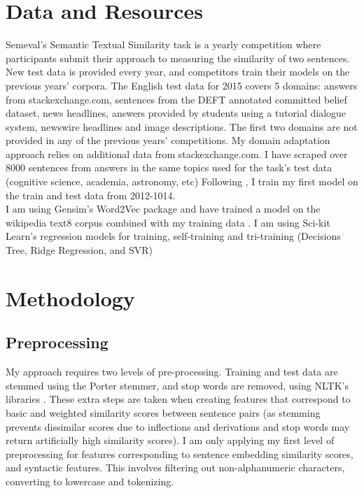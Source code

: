 \documentclass[11pt]{article}
\begin{document}
\section{Data and Resources}
Semeval's Semantic Textual Similarity task is a yearly competition where participants submit their approach to measuring the similarity of two sentences. New test data is provided every year, and competitors train their models on the previous years' corpora. The English test data for 2015 covers 5 domains: answers from stackexchange.com, sentences from the DEFT annotated committed belief dataset, news headlines, answers provided by students using a tutorial dialogue system, newswire headlines and image descriptions\cite{agirrea2015semeval}. The first two domains are not provided in any of the previous years' competitions. My domain adaptation approach relies on additional data from stackexchange.com. I have scraped over 8000 sentences from answers in the same topics used for the task's test data (cognitive science, academia, astronomy, etc) Following \cite{arora2015dcu}, I train my first model on the train and test data from 2012-1014.  \\

I am using Gensim's Word2Vec package and have trained a model on the wikipedia text8 corpus combined with my training data \cite{rehurek_lrec}. I am using Sci-kit Learn's regression models for training, self-training and tri-training (Decisions Tree, Ridge Regression, and SVR) \cite{scikit-learn}\\

\section{Methodology}
\subsection{Preprocessing}
My approach requires two levels of pre-processing. Training and test data are stemmed using the Porter stemmer, and stop words are removed, using NLTK's libraries \cite{BirdKleinLoper09}. These extra steps are taken when creating features that correspond to basic and weighted similarity scores between sentence pairs (as stemming prevents dissimilar scores due to inflections and derivations and stop words may return artificially high similarity scores). I am only applying my first level of preprocessing for features corresponding to sentence embedding similarity scores, and syntactic features. This involves filtering out non-alphanumeric characters, converting to lowercase and tokenizing.  \\
\end{document}
